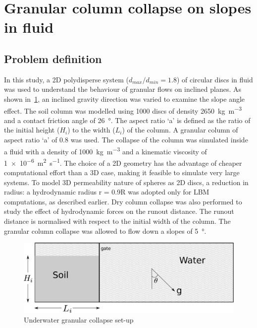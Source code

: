 \documentclass[12pt,twoside]{tuhhproc-en}
\begin{document}
\section{Granular column collapse on slopes in fluid}
\subsection{Problem definition}
In this study, a 2D polydisperse system ($d_{max}/d_{min} = 1.8$) of circular discs in fluid was used to understand the behaviour of granular flows on inclined planes. As shown in~\cref{fig:setup}, an inclined gravity direction was varied to examine the slope angle effect. The soil column was modelled using 1000 discs of density \SI{2650}{\kg\per\cubic\meter} and a contact friction angle of \SI{26}{\degree}. The aspect ratio `a' is defined as the ratio of the initial height ($H_i$) to the width ($L_i$) of the column. A granular column of aspect ratio `a' of 0.8 was used. The collapse of the column was simulated inside a fluid with a density of \SI{1000}{\kg\per\cubic\meter} and a kinematic viscosity of \SI{1e-6}{\square\meter\per\second}. The choice of a 2D geometry has the advantage of cheaper computational effort than a 3D case, making it feasible to simulate very large systems. To model 3D permeability nature of spheres as 2D discs, a reduction in radius: a  hydrodynamic radius r = 0.9R was adopted only for LBM computations, as described earlier. Dry column collapse was also performed to study the effect of hydrodynamic forces on the runout distance. The runout distance is normalised with respect to the initial width of the column. The granular column collapse was allowed to flow down a slopes of \SI{5}{\degree}. 


\begin{figure}[htpb]
\includegraphics[width=0.97\columnwidth]{figs/geometry}
\caption{Underwater granular collapse set-up}
\label{fig:setup}
\end{figure}
\end{document}
